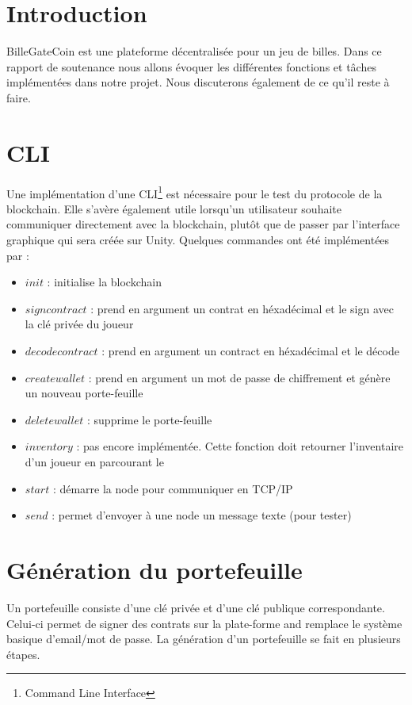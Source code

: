 \documentclass{article}
\begin{document}
\section{Introduction}
BilleGateCoin est une plateforme décentralisée pour un jeu de billes.
Dans ce rapport de soutenance nous allons évoquer les différentes fonctions et tâches implémentées dans notre projet.
Nous discuterons également de ce qu'il reste à faire.

\section{CLI}
Une implémentation d'une CLI\footnote{Command Line Interface} est nécessaire pour le test du protocole de la blockchain. Elle s'avère également utile lorsqu'un utilisateur souhaite communiquer directement avec la blockchain, plutôt que de passer par l'interface graphique qui sera créée sur Unity.
Quelques commandes ont été implémentées par  :

\begin{itemize}
    \item $init$ : initialise la blockchain
    \item $signcontract$ : prend en argument un contrat en héxadécimal et le sign avec la clé privée du joueur
    \item $decodecontract$ : prend en argument un contract en héxadécimal et le décode
    \item $createwallet$ : prend en argument un mot de passe de chiffrement et génère un nouveau porte-feuille
    \item $deletewallet$ : supprime le porte-feuille
    \item $inventory$ : pas encore implémentée. Cette fonction doit retourner l'inventaire d'un joueur en parcourant le 
    \item $start$ : démarre la node pour communiquer en TCP/IP
    \item $send$ : permet d'envoyer à une node un message texte (pour tester)
\end{itemize}


\section{Génération du portefeuille}
Un portefeuille consiste d'une clé privée et d'une clé publique correspondante. Celui-ci permet de signer des contrats sur la plate-forme and remplace le système basique d'email/mot de passe.
La génération d'un portefeuille se fait en plusieurs étapes.
\end{document}
